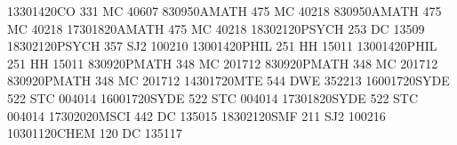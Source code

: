 \documentclass[preview]{standalone}
\begin{document}
\begin{center}
\begin{landscape}
\begin{timetable}
 {1330}{1420}{CO 331 {\tiny }}{\tiny }{MC 4060}{7}
 {830}{950}{AMATH 475 {\tiny }}{\tiny }{MC 4021}{8}
 {830}{950}{AMATH 475 {\tiny }}{\tiny }{MC 4021}{8}
 {1730}{1820}{AMATH 475 {\tiny }}{\tiny }{MC 4021}{8}
 {1830}{2120}{PSYCH 253 {\tiny }}{\tiny }{DC 1350}{9}
 {1830}{2120}{PSYCH 357 {\tiny }}{\tiny }{SJ2 1002}{10}
 {1300}{1420}{PHIL 251 {\tiny }}{\tiny }{HH 150}{11}
 {1300}{1420}{PHIL 251 {\tiny }}{\tiny }{HH 150}{11}
 {830}{920}{PMATH 348 {\tiny }}{\tiny }{MC 2017}{12}
 {830}{920}{PMATH 348 {\tiny }}{\tiny }{MC 2017}{12}
 {830}{920}{PMATH 348 {\tiny }}{\tiny }{MC 2017}{12}
 {1430}{1720}{MTE 544 {\tiny }}{\tiny }{DWE 3522}{13}
 {1600}{1720}{SYDE 522 {\tiny }}{\tiny }{STC 0040}{14}
 {1600}{1720}{SYDE 522 {\tiny }}{\tiny }{STC 0040}{14}
 {1730}{1820}{SYDE 522 {\tiny }}{\tiny }{STC 0040}{14}
 {1730}{2020}{MSCI 442 {\tiny }}{\tiny }{DC 1350}{15}
 {1830}{2120}{SMF 211 {\tiny }}{\tiny }{SJ2 1002}{16}
 {1030}{1120}{CHEM 120 {\tiny }}{\tiny }{DC 1351}{17}

\end{timetable}
\end{landscape}
\end{center}
\end{document}
